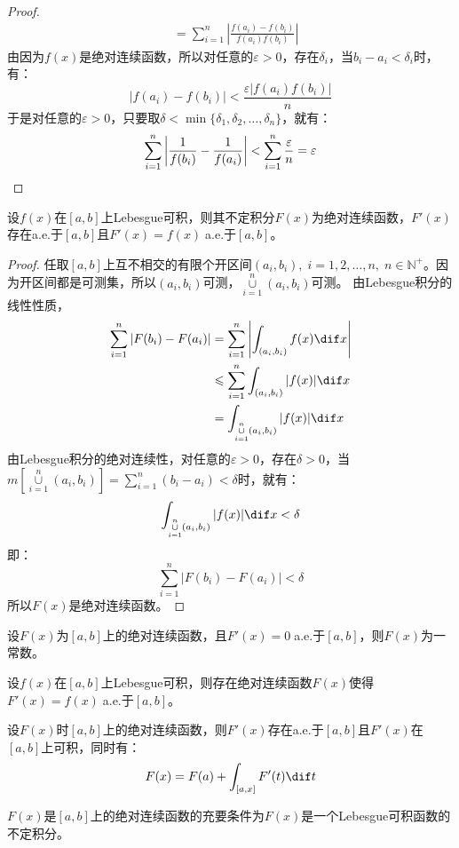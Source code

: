 \begin{proof}
\begin{align*}
		&=\sum_{i=1}^{n}\left|\frac{f(a_i)-f(b_i)}{f(a_i)f(b_i)}\right|
	\end{align*}
	由因为$f(x)$是绝对连续函数，所以对任意的$\varepsilon>0$，存在$\delta_i$，当$b_i-a_i<\delta_i$时，有：
	\begin{equation*}
		|f(a_i)-f(b_i)|<\frac{\varepsilon |f(a_i)f(b_i)|}{n}
	\end{equation*}
	于是对任意的$\varepsilon>0$，只要取$\delta<\min\{\delta_1,\delta_2,\dots,\delta_n\}$，就有：
	\begin{equation*}
		\sum_{i=1}^{n}\left|\frac{1}{f(b_i)}-\frac{1}{f(a_i)}\right|<\sum_{i=1}^{n}\frac{\varepsilon}{n}=\varepsilon\qedhere
	\end{equation*}
\end{proof}
\begin{theorem}
	设$f(x)$在$[a,b]$上Lebesgue可积，则其不定积分$F(x)$为绝对连续函数，$F'(x)$存在a.e.于$[a,b]$且$F'(x)=f(x)\;$a.e.于$[a,b]$。
\end{theorem}
\begin{proof}
	任取$[a,b]$上互不相交的有限个开区间$(a_i,b_i),\;i=1,2,\dots,n,\;n\in\mathbb{N}^+$。因为开区间都是可测集，所以$(a_i,b_i)$可测，$\underset{i=1}{\overset{n}{\cup}}(a_i,b_i)$可测。
	由Lebesgue积分的线性性质，
	\begin{align*}
		\sum_{i=1}^{n}|F(b_i)-F(a_i)|
		&=\sum_{i=1}^{n}\left|\int_{(a_i,b_i)}f(x)\dif x\right| \\
		&\leqslant\sum_{i=1}^{n}\int_{(a_i,b_i)}|f(x)|\dif x \\
		&=\int_{\underset{i=1}{\overset{n}{\cup}}(a_i,b_i)}^{}|f(x)|\dif x
	\end{align*}
	由Lebesgue积分的绝对连续性，对任意的$\varepsilon>0$，存在$\delta>0$，当$m\left[\underset{i=1}{\overset{n}{\cup}}(a_i,b_i)\right]=\sum\limits_{i=1}^{n}(b_i-a_i)<\delta$时，就有：
	\begin{equation*}
		\int_{\underset{i=1}{\overset{n}{\cup}}(a_i,b_i)}^{}|f(x)|\dif x<\delta
	\end{equation*}
	即：
	\begin{equation*}
		\sum_{i=1}^{n}|F(b_i)-F(a_i)|<\delta
	\end{equation*}
	所以$F(x)$是绝对连续函数。
\end{proof}
\begin{theorem}
	设$F(x)$为$[a,b]$上的绝对连续函数，且$F'(x)=0\;$a.e.于$[a,b]$，则$F(x)$为一常数。
\end{theorem}
\begin{theorem}
	设$f(x)$在$[a,b]$上Lebesgue可积，则存在绝对连续函数$F(x)$使得$F'(x)=f(x)\;$a.e.于$[a,b]$。
\end{theorem}
\begin{theorem}
	设$F(x)$时$[a,b]$上的绝对连续函数，则$F'(x)$存在a.e.于$[a,b]$且$F'(x)$在$[a,b]$上可积，同时有：
	\begin{equation*}
		F(x)=F(a)+\int_{[a,x]}^{}F'(t)\dif t
	\end{equation*}
\end{theorem}
\begin{corollary}
	$F(x)$是$[a,b]$上的绝对连续函数的充要条件为$F(x)$是一个Lebesgue可积函数的不定积分。
\end{corollary}